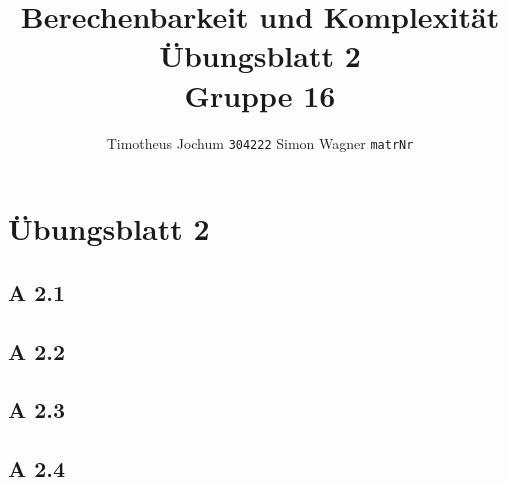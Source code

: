 \documentclass[a4paper,12pt]{article}
\title{Berechenbarkeit und Komplexität \\ Übungsblatt 2 \\ Gruppe 16}
\author{Timotheus Jochum {\small\texttt{304222}} Simon Wagner \small\texttt{matrNr}}
\begin{document}
\maketitle

\newpage

\section*{Übungsblatt 2}
\subsection*{A 2.1}

\subsection*{A 2.2}

\subsection*{A 2.3}

\subsection*{A 2.4}
\end{document}
